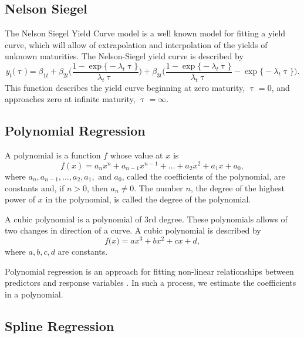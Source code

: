 \subsection{Nelson Siegel}

\noindent The Nelson Siegel Yield Curve model is a well known model for fitting a yield curve, which will allow of extrapolation and interpolation of the yields of unknown maturities. The Nelson-Siegel yield curve is described by \begin{equation*}
    y_t \bigl( \uptau \bigr) = \beta_{1t} + \beta_{2t} \Biggl( \frac{1 - \exp \bigl\{ - \lambda_t \uptau \bigr\} } {\lambda_t \uptau} \Biggr) + \beta_{3t} \Biggl( \frac{1 - \exp \bigl\{ - \lambda_t \uptau \bigr\} } {\lambda_t \uptau} - \exp \bigl\{ - \lambda_t \uptau \bigr\} \Biggr).
\end{equation*} This function describes the yield curve beginning at zero maturity, $\uptau = 0$, and approaches zero at infinite maturity, $\uptau = \infty$. \cite{science_direct_nelson_siegel}

\subsection{Polynomial Regression}

\noindent A polynomial is a function $f$ whose value at $x$ is \begin{equation*}
    f(x) = a_n x^n + a_{n-1} x^{n-1} + \ldots + a_2 x^2 + a_1 x + a_0,
\end{equation*} where $a_n, a_{n-1}, \ldots, a_2, a_1, \text{ and } a_0$, called the coefficients of the polynomial, are constants and, if $n > 0$, then $a_n \neq 0$. The number $n$, the degree of the highest power of $x$ in the polynomial, is called the degree of the polynomial. \cite[p.~39]{calc}

A cubic polynomial is a polynomial of 3rd degree. These polynomials allows of two changes in direction of a curve. A cubic polynomial is described by \begin{equation*}
    f \bigl( x \bigr) = a x^3 + b x^2 + c x + d,
\end{equation*} where $a, b, c,d$ are constants.

Polynomial regression is an approach for fitting non-linear relationships between predictors and response variables \cite[p.~290]{intro_stat_learning}. In such a process, we estimate the coefficients in a polynomial.

\subsection{Spline Regression}

